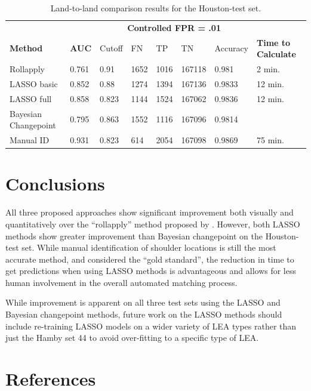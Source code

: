 \documentclass[12pt]{article}
\begin{document}
\begin{table}[]
\centering
\begin{tabular}{llllllll}
& & \multicolumn{5}{c}{\textbf{Controlled FPR = .01}} & \\
\textbf{Method} & \textbf{AUC} & Cutoff & FN &TP & TN & Accuracy & \textbf{Time to Calculate} \\ \hline
Rollapply & 0.761 &  0.91 & 1652 & 1016&167118 & 0.981 & 2 min. \\ \hline
LASSO basic & 0.852 &  0.88 &1274 & 1394&167136 & 0.9833 & 12 min. \\ \hline
LASSO full & 0.858 &  0.823 &1144 &1524 &167062 & 0.9836 & 12 min. \\ \hline
Bayesian Changepoint & 0.795 &  0.863 &1552 & 1116&167096 & 0.9814 & \\ \hline
Manual ID & 0.931 &  0.823 & 614& 2054&167098 & 0.9869 & 75 min. \\ \hline 
\end{tabular}
\caption{Land-to-land comparison results for the Houston-test set.}
\label{houston-table}
\end{table}

\section{Conclusions}

All three proposed approaches show significant improvement both visually
and quantitatively over the ``rollapply'' method proposed by
\cite{Hare1}. However, both LASSO methods show greater improvement than
Bayesian changepoint on the Houston-test set. While manual
identification of shoulder locations is still the most accurate method,
and considered the ``gold standard'', the reduction in time to get
predictions when using LASSO methods is advantageous and allows for less
human involvement in the overall automated matching process.

While improvement is apparent on all three test sets using the LASSO and
Bayesian changepoint methods, future work on the LASSO methods should
include re-training LASSO models on a wider variety of LEA types rather
than just the Hamby set 44 to avoid over-fitting to a specific type of
LEA.


\section{References}
\end{document}
